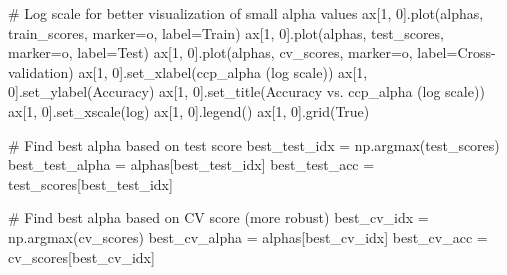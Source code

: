 \documentclass[
  letterpaper,
  DIV=11,
  numbers=noendperiod]{scrreprt}
\newenvironment{Shaded}{\begin{snugshade}}{\end{snugshade}}
\newcommand{\CommentTok}[1]{\textcolor[rgb]{0.37,0.37,0.37}{#1}}
\newcommand{\DecValTok}[1]{\textcolor[rgb]{0.68,0.00,0.00}{#1}}
\newcommand{\NormalTok}[1]{\textcolor[rgb]{0.00,0.23,0.31}{#1}}
\newcommand{\OperatorTok}[1]{\textcolor[rgb]{0.37,0.37,0.37}{#1}}
\newcommand{\StringTok}[1]{\textcolor[rgb]{0.13,0.47,0.30}{#1}}
\newcommand{\VariableTok}[1]{\textcolor[rgb]{0.07,0.07,0.07}{#1}}
\begin{document}
\begin{Shaded}
\begin{Highlighting}[]
\CommentTok{\# Log scale for better visualization of small alpha values}
\NormalTok{ax[}\DecValTok{1}\NormalTok{, }\DecValTok{0}\NormalTok{].plot(alphas, train\_scores, marker}\OperatorTok{=}\StringTok{\textquotesingle{}o\textquotesingle{}}\NormalTok{, label}\OperatorTok{=}\StringTok{\textquotesingle{}Train\textquotesingle{}}\NormalTok{)}
\NormalTok{ax[}\DecValTok{1}\NormalTok{, }\DecValTok{0}\NormalTok{].plot(alphas, test\_scores, marker}\OperatorTok{=}\StringTok{\textquotesingle{}o\textquotesingle{}}\NormalTok{, label}\OperatorTok{=}\StringTok{\textquotesingle{}Test\textquotesingle{}}\NormalTok{)}
\NormalTok{ax[}\DecValTok{1}\NormalTok{, }\DecValTok{0}\NormalTok{].plot(alphas, cv\_scores, marker}\OperatorTok{=}\StringTok{\textquotesingle{}o\textquotesingle{}}\NormalTok{, label}\OperatorTok{=}\StringTok{\textquotesingle{}Cross{-}validation\textquotesingle{}}\NormalTok{)}
\NormalTok{ax[}\DecValTok{1}\NormalTok{, }\DecValTok{0}\NormalTok{].set\_xlabel(}\StringTok{\textquotesingle{}ccp\_alpha (log scale)\textquotesingle{}}\NormalTok{)}
\NormalTok{ax[}\DecValTok{1}\NormalTok{, }\DecValTok{0}\NormalTok{].set\_ylabel(}\StringTok{\textquotesingle{}Accuracy\textquotesingle{}}\NormalTok{)}
\NormalTok{ax[}\DecValTok{1}\NormalTok{, }\DecValTok{0}\NormalTok{].set\_title(}\StringTok{\textquotesingle{}Accuracy vs. ccp\_alpha (log scale)\textquotesingle{}}\NormalTok{)}
\NormalTok{ax[}\DecValTok{1}\NormalTok{, }\DecValTok{0}\NormalTok{].set\_xscale(}\StringTok{\textquotesingle{}log\textquotesingle{}}\NormalTok{)}
\NormalTok{ax[}\DecValTok{1}\NormalTok{, }\DecValTok{0}\NormalTok{].legend()}
\NormalTok{ax[}\DecValTok{1}\NormalTok{, }\DecValTok{0}\NormalTok{].grid(}\VariableTok{True}\NormalTok{)}

\CommentTok{\# Find best alpha based on test score}
\NormalTok{best\_test\_idx }\OperatorTok{=}\NormalTok{ np.argmax(test\_scores)}
\NormalTok{best\_test\_alpha }\OperatorTok{=}\NormalTok{ alphas[best\_test\_idx]}
\NormalTok{best\_test\_acc }\OperatorTok{=}\NormalTok{ test\_scores[best\_test\_idx]}

\CommentTok{\# Find best alpha based on CV score (more robust)}
\NormalTok{best\_cv\_idx }\OperatorTok{=}\NormalTok{ np.argmax(cv\_scores)}
\NormalTok{best\_cv\_alpha }\OperatorTok{=}\NormalTok{ alphas[best\_cv\_idx]}
\NormalTok{best\_cv\_acc }\OperatorTok{=}\NormalTok{ cv\_scores[best\_cv\_idx]}


\end{Highlighting}
\end{Shaded}
\end{document}
